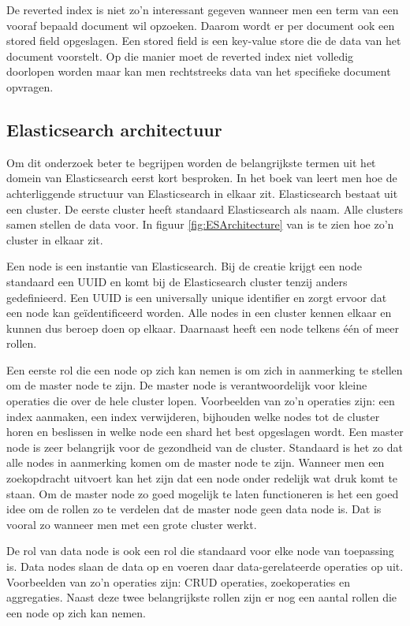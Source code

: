 De reverted index is niet zo'n interessant gegeven wanneer men een term van een vooraf bepaald document wil opzoeken. Daarom wordt er per document ook een stored field opgeslagen. Een stored field is een key-value store die de data van het document voorstelt. Op die manier moet de reverted index niet volledig doorlopen worden maar kan men rechtstreeks data van het specifieke document opvragen.

\subsection{Elasticsearch architectuur}
\label{architectuur}

Om dit onderzoek beter te begrijpen worden de belangrijkste termen uit het domein van Elasticsearch eerst kort besproken. In het boek van \textcite{Dixit2016} leert men hoe de achterliggende structuur van Elasticsearch in elkaar zit. Elasticsearch bestaat uit een cluster. De eerste cluster heeft standaard Elasticsearch als naam. Alle clusters samen stellen de data voor. In figuur \ref{fig:ESArchitecture} van \textcite{Babaev2013} is te zien hoe zo'n cluster in elkaar zit.

Een node is een instantie van Elasticsearch. Bij de creatie krijgt een node standaard een UUID en komt bij de Elasticsearch cluster tenzij anders gedefinieerd. Een UUID is een universally unique identifier en zorgt ervoor dat een node kan geïdentificeerd worden. Alle nodes in een cluster kennen elkaar en kunnen dus beroep doen op elkaar. Daarnaast heeft een node telkens één of meer rollen.

Een eerste rol die een node op zich kan nemen is om zich in aanmerking te stellen om de master node te zijn. De master node is verantwoordelijk voor kleine operaties die over de hele cluster lopen. Voorbeelden van zo’n operaties zijn: een index aanmaken, een index verwijderen, bijhouden welke nodes tot de cluster horen en beslissen in welke node een shard het best opgeslagen wordt. Een master node is zeer belangrijk voor de gezondheid van de cluster. Standaard is het zo dat alle nodes in aanmerking komen om de master node te zijn. Wanneer men een zoekopdracht uitvoert kan het zijn dat een node onder redelijk wat druk komt te staan. Om de master node zo goed mogelijk te laten functioneren is het een goed idee om de rollen zo te verdelen dat de master node geen data node is. Dat is vooral zo wanneer men met een grote cluster werkt.

De rol van data node is ook een rol die standaard voor elke node van toepassing is. Data nodes slaan de data op en voeren daar data-gerelateerde operaties op uit. Voorbeelden van zo’n operaties zijn: CRUD operaties, zoekoperaties en aggregaties. Naast deze twee belangrijkste rollen zijn er nog een aantal rollen die een node op zich kan nemen.

